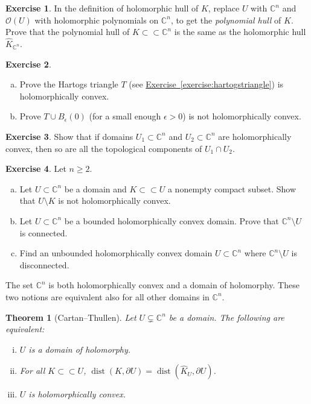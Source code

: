 \documentclass[12pt,openany]{book}
\newcommand{\C}{{\mathbb{C}}}
\newcommand{\sO}{{\mathscr{O}}}
\newcommand{\myindex}[1]{#1\index{#1}}
\theoremstyle{plain}
\newtheorem{thm}{Theorem}[section]
\theoremstyle{remark}
\theoremstyle{definition}
\newenvironment{exbox}{%
    \def\FrameCommand{\vrule width 1pt \relax\hspace{10pt}}%
    \MakeFramed{\advance\hsize-\width\FrameRestore}%
}{%
    \endMakeFramed
}
\newenvironment{exparts}{%
    \leavevmode\begin{enumerate}[a),noitemsep,topsep=0pt,parsep=0pt,partopsep=0pt]
}{%
    \end{enumerate}
}
\theoremstyle{exercise}
\newtheorem{exercise}{Exercise}[section]
\theoremstyle{example}
\newcommand{\exerciseref}[1]{\hyperref[#1]{Exercise~\ref*{#1}}}
\begin{document}
\begin{exbox}
\begin{exercise}
In the definition of holomorphic hull of $K$, replace $U$ with $\C^n$
and $\sO(U)$ with holomorphic polynomials on $\C^n$, to get the
\emph{\myindex{polynomial hull}} of $K$.  Prove that the polynomial hull of
$K \subset \subset \C^n$ is the same as the holomorphic hull $\widehat{K}_{\C^n}$.
\end{exercise}

\begin{exercise}
\begin{exparts}
\item Prove the Hartogs triangle $T$ (see \exerciseref{exercise:hartogstriangle})
is holomorphically convex.
\item Prove $T \cup B_{\epsilon}(0)$ (for a small enough $\epsilon > 0$) is
not holomorphically convex.
\end{exparts}
\end{exercise}

\begin{exercise}
Show that if domains $U_1 \subset \C^n$ and $U_2 \subset \C^n$ are
holomorphically convex,
then so are all the topological components of $U_1 \cap U_2$.
\end{exercise}

\begin{exercise}
\pagebreak[2]
Let $n \geq 2$.
\begin{exparts}
\item
Let $U \subset \C^n$ be a domain and $K \subset \subset U$
a nonempty compact subset.  Show that $U \setminus K$ is not
holomorphically convex.
\item
Let $U \subset \C^n$ be a bounded holomorphically
convex domain.  Prove that $\C^n \setminus U$ is connected.
\item
Find an unbounded holomorphically convex domain $U \subset \C^n$ where
$\C^n \setminus U$ is disconnected.
\end{exparts}
\end{exercise}
\end{exbox}

\pagebreak[2]
The set $\C^n$ is both holomorphically convex and
a domain of holomorphy.  These two notions are equivalent also for all
other domains in $\C^n$.

\begin{thm}[Cartan--Thullen]
\pagebreak[2]
\label{thm:cartthul}
Let $U \subsetneq \C^n$ be a domain.  The following are equivalent:
\begin{enumerate}[(i)]
\item \label{thm:cartthul:domhol}
$U$ is a domain of holomorphy.
\item \label{thm:cartthul:disthull}
For all $K \subset \subset U$,
$\operatorname{dist}(K,\partial U) = \operatorname{dist}(\widehat{K}_U,\partial U)$.
\item \label{thm:cartthul:holconv}
$U$ is holomorphically convex.
\end{enumerate}
\end{thm}
\end{document}
